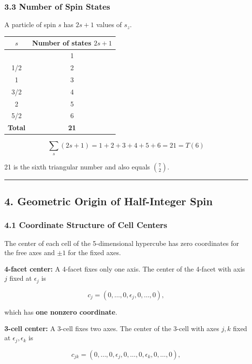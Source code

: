 \documentclass[a4paper,11pt]{article}
\newcounter{none}
\begin{document}
\subsubsection*{3.3 Number of Spin States}

A particle of spin $s$ has $2s + 1$ values of $s_z$.

{\def\LTcaptype{none}
\begin{longtable}[]{@{}cc@{}}
\toprule
$s$ & Number of states $2s+1$ \\
\midrule
\endhead
\bottomrule
\endlastfoot
0 & 1 \\
1/2 & 2 \\
1 & 3 \\
3/2 & 4 \\
2 & 5 \\
5/2 & 6 \\
\textbf{Total} & \textbf{21} \\
\end{longtable}
}

\[\sum_{s} (2s+1) = 1 + 2 + 3 + 4 + 5 + 6 = 21 = T(6)\]

21 is the sixth triangular number and also equals $\binom{7}{2}$.

\begin{center}\rule{0.5\linewidth}{0.5pt}\end{center}

\subsection*{4. Geometric Origin of Half-Integer Spin}

\subsubsection*{4.1 Coordinate Structure of Cell Centers}

The center of each cell of the 5-dimensional hypercube has zero coordinates for the free axes and $\pm 1$ for the fixed axes.

\textbf{4-facet center:} A 4-facet fixes only one axis. The center of the 4-facet with axis $j$ fixed at $\epsilon_j$ is

\[c_j = (0, \ldots, 0, \epsilon_j, 0, \ldots, 0),\]

which has \textbf{one nonzero coordinate}.

\textbf{3-cell center:} A 3-cell fixes two axes. The center of the 3-cell with axes $j, k$ fixed at $\epsilon_j, \epsilon_k$ is

\[c_{jk} = (0, \ldots, 0, \epsilon_j, 0, \ldots, 0, \epsilon_k, 0, \ldots, 0),\]
\end{document}
